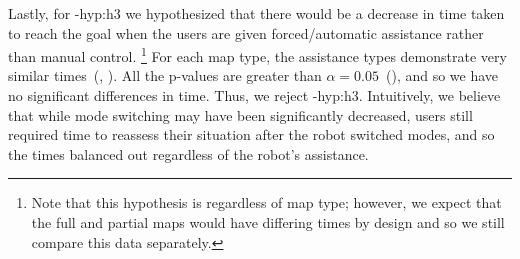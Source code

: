 Lastly, for \hyp{hyp:h3} we hypothesized that there would be a decrease in time taken to reach the goal when the users are given forced/automatic assistance rather than manual control. \footnote{Note that this hypothesis is regardless of map type; however, we expect that the full and partial maps would have differing times by design and so we still compare this data separately.} 
For each map type, the assistance types demonstrate very similar times~(, ). All the p-values are greater than $\alpha = 0.05$~(), and so we have no significant differences in time. Thus, we reject \hyp{hyp:h3}. Intuitively, we believe that while mode switching may have been significantly decreased, users still required time to reassess their situation after the robot switched modes, and so the times balanced out regardless of the robot’s assistance.

